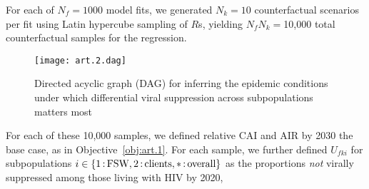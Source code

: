 For each of $N_f = 1000$ model fits,
we generated $N_k = 10$ counterfactual scenarios per fit
using Latin hypercube sampling of $R$s,
yielding $N_f N_k = {}$10,000 total counterfactual samples for the regression.
\begin{figure}
  \centering\texttt{[image: art.2.dag]}
  \caption{Directed acyclic graph (DAG) for inferring
    the epidemic conditions under which
    differential viral suppression across subpopulations matters most}
  \label{fig:art.2.dag}
\end{figure}
\par
For each of these 10,000 samples, we defined
relative CAI and AIR by 2030 \vs the base case, as in Objective~\ref{obj:art.1}.
For each sample, we further defined
$U_{fki}$ for subpopulations $i \in \{1{\,:\,}\textnormal{FSW}, 2{\,:\,}\textnormal{clients}, *{\,:\,}\textnormal{overall}\}$
as the proportions \emph{not} virally suppressed among those living with HIV by 2020,

